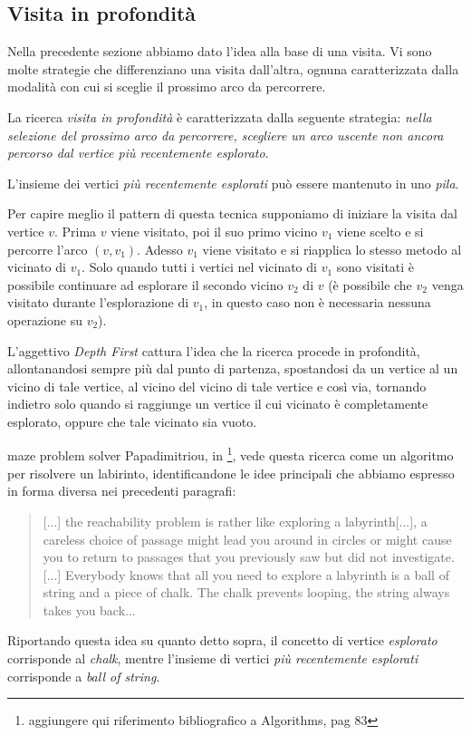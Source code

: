 \subsection{Visita in profondit\`a}
Nella precedente sezione abbiamo dato l'idea alla base di una
visita. Vi sono molte strategie che differenziano una visita
dall'altra, ognuna caratterizzata dalla modalit\`a con cui si sceglie
il prossimo arco da percorrere.

La ricerca \emph{visita in profondit\`a} \`e caratterizzata dalla
seguente strategia: \emph{nella selezione del prossimo arco da
  percorrere, scegliere un arco uscente non ancora percorso dal
  vertice pi\`u recentemente esplorato}.

L'insieme dei vertici \emph{pi\`u recentemente esplorati} pu\`o essere
mantenuto in uno \emph{pila}.

Per capire meglio il pattern di questa tecnica supponiamo di iniziare
la visita dal vertice $v$. Prima $v$ viene visitato, poi il suo primo
vicino $v_{1}$ viene scelto e si percorre l'arco $(v, v_{1})$. Adesso
$v_{1}$ viene visitato e si riapplica lo stesso metodo al vicinato di
$v_{1}$. Solo quando tutti i vertici nel vicinato di $v_{1}$ sono
visitati \`e possibile continuare ad esplorare il secondo vicino
$v_{2}$ di $v$ (\`e possibile che $v_{2}$ venga visitato durante
l'esplorazione di $v_{1}$, in questo caso non \`e necessaria nessuna
operazione su $v_{2}$).

L'aggettivo \emph{Depth First} cattura l'idea che la ricerca procede
in profondit\`a, allontanandosi sempre pi\`u dal punto di partenza,
spostandosi da un vertice al un vicino di tale vertice, al vicino del
vicino di tale vertice e cos\`i via, tornando indietro solo quando si
raggiunge un vertice il cui vicinato \`e completamente esplorato,
oppure che tale vicinato sia vuoto.

\begin{paragraph}{maze problem solver}
  Papadimitriou, in \footnote{aggiungere qui riferimento bibliografico
    a Algorithms, pag 83}, vede questa ricerca come un algoritmo per
  risolvere un labirinto, identificandone le idee principali che
  abbiamo espresso in forma diversa nei precedenti paragrafi:
\begin{quotation}
  [...] the reachability problem is rather like exploring a
  labyrinth[...], a careless choice of passage might lead you around
  in circles or might cause you to return to passages that you
  previously saw but did not investigate.[...] Everybody knows that
  all you need to explore a labyrinth is a ball of string and a piece
  of chalk. The chalk prevents looping, the string always takes you
  back...
\end{quotation}
Riportando questa idea su quanto detto sopra, il concetto di vertice
\emph{esplorato} corrisponde al \emph{chalk}, mentre l'insieme di
vertici \emph{pi\`u recentemente esplorati} corrisponde a \emph{ball
  of string}.
\end{paragraph}

